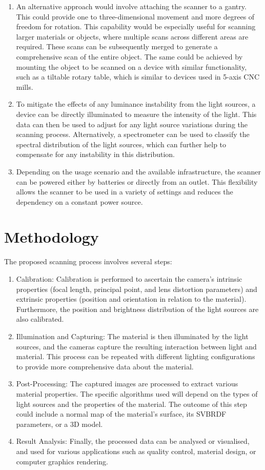 \documentclass[11pt, twoside, listof=totocnumbered, bibliography=totocnumbered]{scrartcl}
\begin{document}
\begin{enumerate}
	\item An alternative approach would involve attaching the scanner to a gantry. This could provide one to three-dimensional movement and more degrees of freedom for rotation. This capability would be especially useful for scanning larger materials or objects, where multiple scans across different areas are required. These scans can be subsequently merged to generate a comprehensive scan of the entire object. The same could be achieved by mounting the object to be scanned on a device with similar functionality, such as a tiltable rotary table, which is similar to devices used in 5-axis CNC mills.
	
	\item To mitigate the effects of any luminance instability from the light sources, a device can be directly illuminated to measure the intensity of the light. This data can then be used to adjust for any light source variations during the scanning process. Alternatively, a spectrometer can be used to classify the spectral distribution of the light sources, which can further help to compensate for any instability in this distribution.
	
	\item Depending on the usage scenario and the available infrastructure, the scanner can be powered either by batteries or directly from an outlet. This flexibility allows the scanner to be used in a variety of settings and reduces the dependency on a constant power source.
\end{enumerate}
	
\section{Methodology}
The proposed scanning process involves several steps:

\begin{enumerate}
	\item Calibration: Calibration is performed to ascertain the camera's intrinsic properties (focal length, principal point, and lens distortion parameters) and extrinsic properties (position and orientation in relation to the material). Furthermore, the position and brightness distribution of the light sources are also calibrated.
	\item Illumination and Capturing: The material is then illuminated by the light sources, and the cameras capture the resulting interaction between light and material. This process can be repeated with different lighting configurations to provide more comprehensive data about the material.
	\item Post-Processing: The captured images are processed to extract various material properties. The specific algorithms used will depend on the types of light sources and the properties of the material. The outcome of this step could include a normal map of the material's surface, its SVBRDF parameters, or a 3D model.
	\item Result Analysis: Finally, the processed data can be analysed or visualised, and used for various applications such as quality control, material design, or computer graphics rendering.
\end{enumerate}
\end{document}
